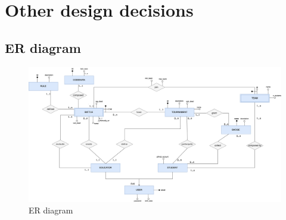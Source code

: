\section{Other design decisions}

\subsection{ER diagram}
\begin{figure}[H]
    \centering
    \includegraphics[width=1\textwidth]{images/ER_diagram.png}
    \caption{ER diagram}
\end{figure}